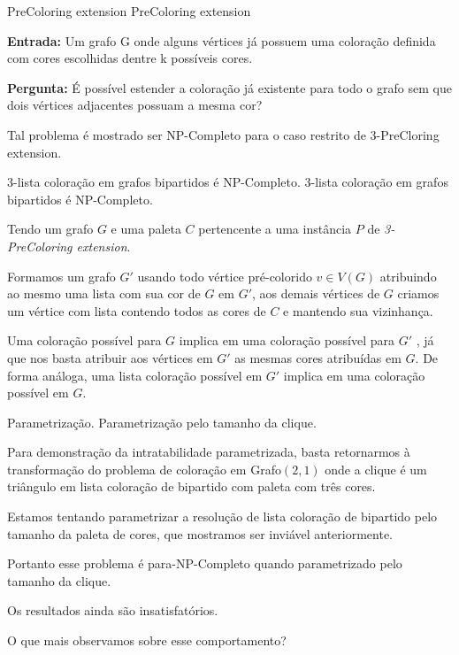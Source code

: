 \documentclass[9pt, compress]{beamer}
\newcommand{\?}{\textcolor{warn}{\textit{?}}}
\begin{document}
     \begin{frame}{PreColoring extension}
      \large{PreColoring extension}
      \normalsize\newline\newline
      
	      \textbf{Entrada:}  Um grafo G onde alguns vértices já possuem uma coloração definida com cores escolhidas dentre k possíveis cores.
	      
	      \textbf{Pergunta:}  É possível estender a coloração já existente para todo o grafo sem que dois vértices adjacentes possuam a mesma cor?
	      
	      Tal problema é mostrado ser NP-Completo para o caso restrito de 3-PreCloring extension.\cite{kratochvil94}
     \end{frame}
     
     \begin{frame}{3-lista coloração em grafos bipartidos é NP-Completo.}
    \large{3-lista coloração em grafos bipartidos é NP-Completo.}
      \normalsize\newline\newline
            
      Tendo um grafo $G$ e uma paleta $C$ pertencente a uma instância $P$ de \emph{3-PreColoring extension}.
      
      Formamos um grafo $G'$ usando todo vértice pré-colorido $v \in V(G)$ atribuindo ao mesmo uma lista com sua cor de $G$ em $G'$, aos demais vértices de $G$ criamos um vértice com lista contendo todos as cores de $C$ e mantendo sua vizinhança.
      
      Uma coloração possível para $G$ implica em uma coloração possível para $G'$ , já que nos basta atribuir aos vértices em $G'$ as mesmas cores atribuídas em $G$. De forma análoga, uma lista coloração possível em $G'$ implica em uma coloração possível em $G$.
      
      
     \end{frame}
     \begin{frame}{Parametrização.}
    \large{Parametrização pelo tamanho da clique.}
      \normalsize\newline\newline
            
      Para demonstração da intratabilidade parametrizada, basta retornarmos à transformação do problema de coloração em Grafo$(2,1)$ onde a clique é um triângulo em lista coloração de bipartido com paleta com três cores.
      
      Estamos tentando parametrizar a resolução de lista coloração de bipartido pelo tamanho da paleta de cores, que mostramos ser inviável anteriormente.
      
      Portanto esse problema é para-NP-Completo quando parametrizado pelo tamanho da clique.
      
     \end{frame}
     \begin{frame}[standout]
       Os resultados ainda são insatisfatórios.
       
       O que mais observamos sobre esse comportamento?
     \end{frame}
     
\end{document}
